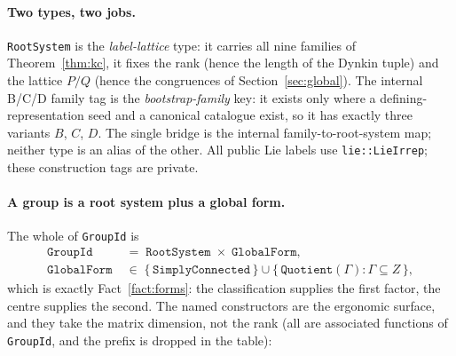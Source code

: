 \documentclass[11pt,a4paper]{article}
\theoremstyle{plain}
\theoremstyle{definition}
\newcommand{\code}[1]{\texttt{#1}}
\begin{document}
\paragraph{Two types, two jobs.} \code{RootSystem} is the
\emph{label-lattice} type: it carries all nine families of
Theorem~\ref{thm:kc}, it fixes the rank (hence the length of the Dynkin tuple)
and the lattice $P/Q$ (hence the congruences of
Section~\ref{sec:global}). The internal B/C/D family tag is the \emph{bootstrap-family}
key: it exists only where a defining-representation seed and a canonical
catalogue exist, so it has exactly three variants $B$, $C$, $D$. The single
bridge is the internal family-to-root-system map; neither type is an alias of the
other. All public Lie labels use \code{lie::LieIrrep}; these construction tags are private.

\paragraph{A group is a root system plus a global form.} The whole of
\code{GroupId} is
\begin{align*}
  \code{GroupId} \;&=\; \code{RootSystem} \;\times\; \code{GlobalForm}, \\
  \code{GlobalForm} \;&\in\; \{\,\code{SimplyConnected}\,\}\cup
                        \{\,\code{Quotient}(\Gamma) : \Gamma\subseteq Z\,\},
\end{align*}
which is exactly Fact~\ref{fact:forms}: the classification supplies the first
factor, the centre supplies the second. The named constructors are the
ergonomic surface, and they take the matrix dimension, not the rank
(all are associated functions of \code{GroupId}, and the prefix is dropped in
the table):
\end{document}
